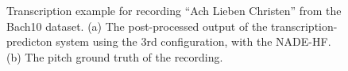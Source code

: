 \begin{figure}
 \caption{Transcription example for recording ``Ach Lieben Christen'' from the Bach10 dataset. (a) The post-processed output of the transcription-predicton system using the 3rd configuration, with the NADE-HF. (b) The pitch ground truth of the recording.}
 \label{fig:Transcription}
\end{figure}

